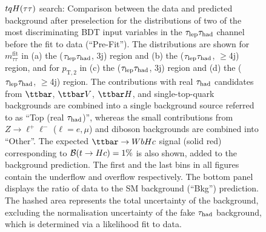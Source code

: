 \begin{figure}[t]
\begin{center}
\caption{$tqH(\tau\tau)$ search: Comparison between the data and predicted background after preselection for the distributions of two of the most
discriminating BDT input variables in the $\tau_{\mathrm{lep}} \tau_{\mathrm{had}}$ channel before the fit to data (``Pre-Fit''). The distributions are shown for
$m_{\tau\tau}^{\text{fit}}$ in (a) the ($\tau_{\mathrm{lep}} \tau_{\mathrm{had}}$, 3j) region and (b) the ($\tau_{\mathrm{lep}} \tau_{\mathrm{had}}$, $\geq$4j) region, and for
$p_{\text{T},2}$ in (c) the ($\tau_{\mathrm{lep}} \tau_{\mathrm{had}}$, 3j)  region and (d) the ($\tau_{\mathrm{lep}} \tau_{\mathrm{had}}$, $\geq$4j) region.
The contributions with real $\tau_{\mathrm{had}}$ candidates from $\ttbar$,  $\ttbar V$, $\ttbar H$, and single-top-quark backgrounds are combined into
a single background source referred to as ``Top (real $\tau_{\mathrm{had}}$)'', whereas the small contributions from 
$Z\to \ell^+\ell^-$ ($\ell = e, \mu$) and diboson backgrounds are combined into ``Other''. 
The expected $\Hc$ signal (solid red) corresponding to $\mathcal{B}(t\to Hc)=1\%$ is also shown,
added to the background prediction.
The first and the last bins in all figures contain the underflow and overflow respectively.
The bottom panel displays the ratio of data to the SM background (``Bkg'') prediction.
The hashed area represents the total uncertainty of the background, excluding the normalisation uncertainty of the fake $\tau_{\mathrm{had}}$ background, 
which is determined via a likelihood fit to data.}
\label{fig:BDT_inputs_lephad}
\end{center}
\end{figure}


